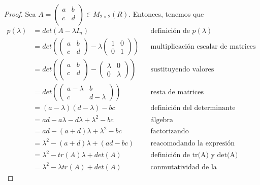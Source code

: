 \documentclass[letterpaper,11pt]{article}
\begin{document}
\begin{enumerate}
    \begin{proof}
        Sea $A = \begin{pmatrix} a & b \\ c & d \\ \end{pmatrix} \in 
        M_{2 \times 2}(R)$. Entonces, tenemos que
        \begin{align*}
            p(\lambda) 
            &= det(A - \lambda I_n)
            && \text{definición de $p(\lambda)$} \\
            &= det \left( \begin{pmatrix} a & b \\ c & d \end{pmatrix} - 
                          \lambda \begin{pmatrix} 1 & 0 \\ 0 & 1 \end{pmatrix}
                   \right) 
            && \text{multiplicación escalar de matrices} \\
            &= det \left(\begin{pmatrix} a & b \\ c & d \\ \end{pmatrix} - 
                         \begin{pmatrix} \lambda & 0 \\ 0 & \lambda \end{pmatrix} 
                   \right)
            && \text{sustituyendo valores} \\
            &= det \left( \begin{pmatrix} a - \lambda & b \\ c & d -\lambda 
                          \end{pmatrix} \right)
            && \text{resta de matrices} \\
            &= (a - \lambda) (d - \lambda) - bc
            && \text{definición del determinante} \\ 
            &= ad - a\lambda - d\lambda + \lambda^2 - bc
            && \text{álgebra} \\
            &= ad - (a + d)\lambda + \lambda^2 - bc
            && \text{factorizando} \\
            &= \lambda^2 - (a + d)\lambda + (ad - bc)
            && \text{reacomodando la expresión} \\
            &= \lambda^2 - tr(A)\lambda + det(A)
            && \text{definición de tr(A) y det(A)} \\
            &= \lambda^2 - \lambda tr(A) + det(A) 
            && \text{conmutatividad de la multiplicación}
        \end{align*}


\end{proof}
\end{enumerate}
\end{document}
